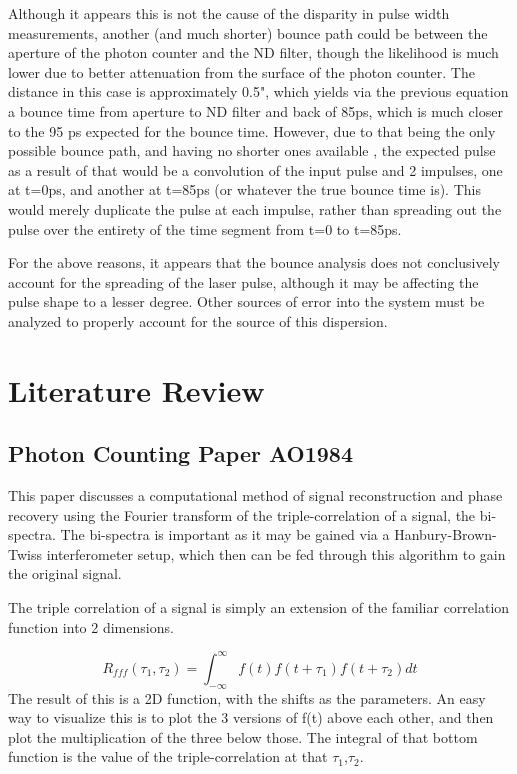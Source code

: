 \documentclass[a4paper]{article}
\begin{document}
Although it appears this is not the cause of the disparity in pulse width measurements, another (and much shorter) bounce path could be between the aperture of the photon counter and the ND filter, though the likelihood is much lower due to better attenuation from the surface of the photon counter. The distance in this case is approximately 0.5", which yields via the previous equation a bounce time from aperture to ND filter and back of 85ps, which is much closer to the 95 ps expected for the bounce time. However, due to that being the only possible bounce path, and having no shorter ones available , the expected pulse as a result of that would be a convolution of the input pulse and 2 impulses, one at t=0ps, and another at t=85ps (or whatever the true bounce time is). This would merely duplicate the pulse at each impulse, rather than spreading out the pulse over the entirety of the time segment from t=0 to t=85ps.

For the above reasons, it appears that the bounce analysis does not conclusively account for the spreading of the laser pulse, although it may be affecting the pulse shape to a lesser degree. Other sources of error into the system must be analyzed to properly account for the source of this dispersion.

\section{Literature Review}
\subsection{Photon Counting Paper AO1984}

This paper discusses a computational method of signal reconstruction and phase recovery using the Fourier transform of the triple-correlation of a signal, the bi-spectra. The bi-spectra is important as it may be gained via a Hanbury-Brown-Twiss interferometer setup, which then can be fed through this algorithm to gain the original signal.

The triple correlation of a signal is simply an extension of the familiar correlation function into 2 dimensions.

\[ 
R_{fff}\left(\tau_1,\tau_2\right)=\int_{-\infty}^{\infty}f\left(t\right)f\left(t+\tau_1\right)f\left(t+\tau_2\right)dt
\]
The result of this is a 2D function, with the shifts as the parameters. An easy way to visualize this is to plot the 3 versions of f(t) above each other, and then plot the multiplication of the three below those. The integral of that bottom function is the value of the triple-correlation at that $\tau_1$,$\tau_2$. 
\end{document}
